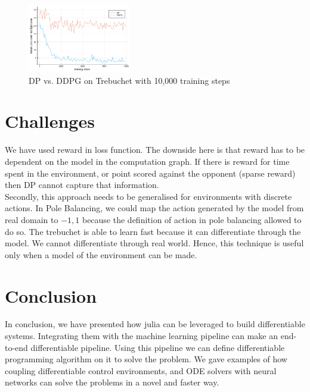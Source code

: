 \documentclass{juliacon}
\begin{document}
\begin{figure}[htbp]
    \centering
        \includegraphics[width=0.4\textwidth,keepaspectratio]{images/trebuchet_DPvsDDPG_10000.png}
            \caption{DP vs. DDPG\cite{Lillicrap2015ContinuousCW} on Trebuchet with 10,000 training steps}
            \label{fig:trebuchet_graph}
\end{figure}

\section{Challenges}
We have used reward in loss function. The downside here is that reward has to be dependent on the model in the computation graph. If there is reward for time spent in the environment, or point scored against the opponent (sparse reward) then DP cannot capture that information. \\
Secondly, this approach needs to be generalised for environments with discrete actions. In Pole Balancing, we could map the action generated by the model from real domain to ${-1, 1}$ because the definition of action in pole balancing allowed to do so.
The trebuchet is able to learn fast because it can differentiate through the model. We cannot differentiate through real world. Hence, this technique is useful only when a model of the environment can be made.

\section{Conclusion}
In conclusion, we have presented how julia can be leveraged to build differentiable systems. Integrating them with the machine learning pipeline can make an end-to-end differentiable pipeline. Using this pipeline we can define differentiable programming algorithm on it to solve the problem. We gave examples of how coupling differentiable control environments, and ODE solvers with neural networks can solve the problems in a novel and faster way.



\end{document}
